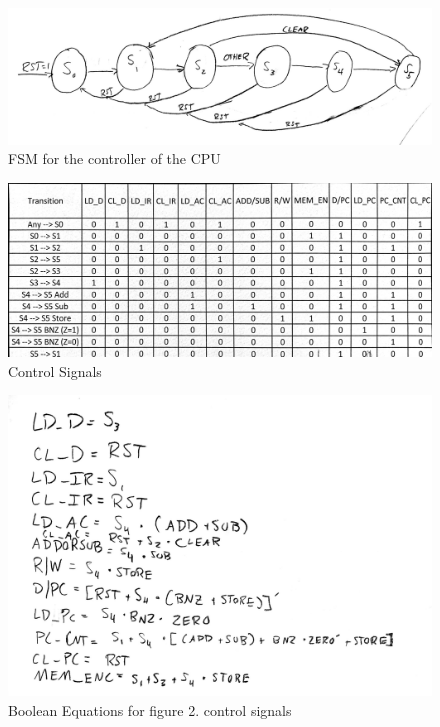 \documentclass[12pt]{article}
\begin{document}
		\begin{figure}[h]
			\includegraphics[scale=.18]{Prelab1.jpg}
			\caption{FSM for the controller of the CPU}
		\end{figure}
		\begin{figure}[h]
			\includegraphics[scale=.15]{Prelab2.jpg}
			\caption{Control Signals}
		\end{figure}
		\newpage
		\begin{figure}[h]
			\includegraphics[scale=.2]{Prelab3.jpg}
			\caption{Boolean Equations for figure 2. control signals}
		\end{figure}
\end{document}
